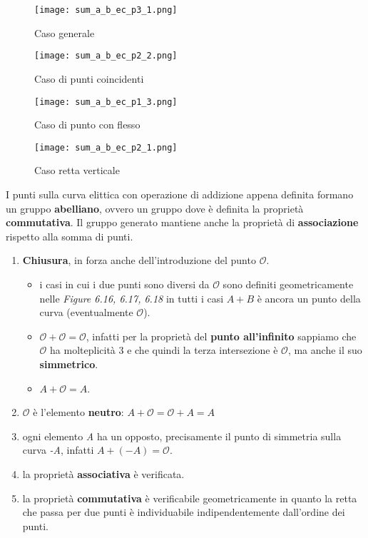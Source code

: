 \begin{figure}[h]
    \centering
    \begin{minipage}[t]{0.45\textwidth}
        \centering
        \texttt{[image: sum\_a\_b\_ec\_p3\_1.png]}
        \caption{Caso generale}
    \end{minipage}
    \hfill
    \begin{minipage}[t]{0.45\textwidth}
        \centering
        \texttt{[image: sum\_a\_b\_ec\_p2\_2.png]}
        \caption{Caso di punti coincidenti}
    \end{minipage}
    \begin{minipage}[t]{0.45\textwidth}
        \centering
        \texttt{[image: sum\_a\_b\_ec\_p1\_3.png]}
        \caption{Caso di punto con flesso}
    \end{minipage}
    \hfill
    \begin{minipage}[t]{0.45\textwidth}
        \centering
        \texttt{[image: sum\_a\_b\_ec\_p2\_1.png]}
        \caption{Caso retta verticale}
    \end{minipage}
\end{figure}
I punti sulla curva elittica con operazione di addizione appena definita formano un gruppo \textbf{abelliano}, ovvero un gruppo dove è definita la proprietà \textbf{commutativa}. Il gruppo generato mantiene anche la proprietà di \textbf{associazione} rispetto alla somma di punti. 
\begin{enumerate}
    \item \textbf{Chiusura}, in forza anche dell'introduzione del punto $\mathcal{O}$.
    \begin{itemize}
        \item i casi in cui i due punti sono diversi da $\mathcal{O}$ sono definiti geometricamente nelle \textit{Figure 6.16, 6.17, 6.18} in tutti i casi $A + B$ è ancora un punto della curva (eventualmente $\mathcal{O}$).
        \item $\mathcal{O} + \mathcal{O} = \mathcal{O}$, infatti per la proprietà del \textbf{punto all'infinito} sappiamo che $\mathcal{O}$ ha molteplicità 3 e che quindi la terza intersezione è $\mathcal{O}$, ma anche il suo \textbf{simmetrico}.
        \item $A + \mathcal{O} = A$.
    \end{itemize}
    \item $\mathcal{O}$ è l'elemento \textbf{neutro}: $A + \mathcal{O} = \mathcal{O} + A = A$
    \item ogni elemento \textit{A} ha un opposto, precisamente il punto di simmetria sulla curva \textit{-A}, infatti $A + (-A) = \mathcal{O}$.
    \item la proprietà \textbf{associativa} è verificata.
    \item la proprietà \textbf{commutativa} è verificabile geometricamente in quanto la retta che passa per due punti è individuabile indipendentemente dall'ordine dei punti.
\end{enumerate}
